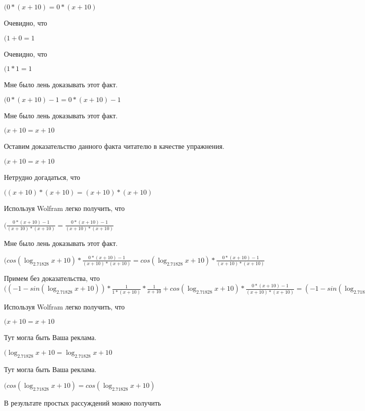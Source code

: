 \documentclass[12pt,a4paper,fleqn]{article}
\theoremstyle{definition}
\begin{document}
$( 0  * ( x  +  10 ) =  0  * ( x  +  10 )$

Очевидно, что

$( 1  +  0  =  1 $

Очевидно, что

$( 1  *  1  =  1 $

Мне было лень доказывать этот факт.

$( 0  * ( x  +  10 ) -  1  =  0  * ( x  +  10 ) -  1 $

Мне было лень доказывать этот факт.

$( x  +  10  =  x  +  10 $

Оставим доказательство данного факта читателю в качестве упражнения.

$( x  +  10  =  x  +  10 $

Нетрудно догадаться, что

$(( x  +  10 ) * ( x  +  10 ) = ( x  +  10 ) * ( x  +  10 )$

Используя Wolfram легко получить, что

$(\frac{ 0  * ( x  +  10 ) -  1 }{( x  +  10 ) * ( x  +  10 )}
 = \frac{ 0  * ( x  +  10 ) -  1 }{( x  +  10 ) * ( x  +  10 )}
$

Мне было лень доказывать этот факт.

$(cos(\log_{ 2.71828 }{ x  +  10 }) * \frac{ 0  * ( x  +  10 ) -  1 }{( x  +  10 ) * ( x  +  10 )}
 = cos(\log_{ 2.71828 }{ x  +  10 }) * \frac{ 0  * ( x  +  10 ) -  1 }{( x  +  10 ) * ( x  +  10 )}
$

Примем без доказательства, что
$(( -1  - sin(\log_{ 2.71828 }{ x  +  10 })) * \frac{ 1 }{ 1  * ( x  +  10 )}
 * \frac{ 1 }{ x  +  10 }
 + cos(\log_{ 2.71828 }{ x  +  10 }) * \frac{ 0  * ( x  +  10 ) -  1 }{( x  +  10 ) * ( x  +  10 )}
 = ( -1  - sin(\log_{ 2.71828 }{ x  +  10 })) * \frac{ 1 }{ 1  * ( x  +  10 )}
 * \frac{ 1 }{ x  +  10 }
 + cos(\log_{ 2.71828 }{ x  +  10 }) * \frac{ 0  * ( x  +  10 ) -  1 }{( x  +  10 ) * ( x  +  10 )}
$

Используя Wolfram легко получить, что

$( x  +  10  =  x  +  10 $

Тут могла быть Ваша реклама.

$(\log_{ 2.71828 }{ x  +  10 } = \log_{ 2.71828 }{ x  +  10 }$

Тут могла быть Ваша реклама.

$(cos(\log_{ 2.71828 }{ x  +  10 }) = cos(\log_{ 2.71828 }{ x  +  10 })$

В результате простых рассуждений можно получить
\end{document}
